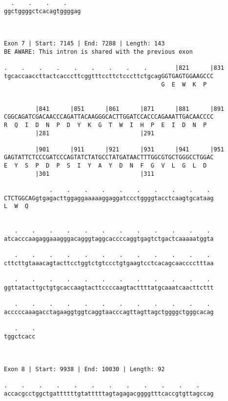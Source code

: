 \documentclass{article}
\begin{document}
\begin{Verbatim}
  .    .    .    .    
ggctggggctcacagtggggag
                      
                      
 
Exon 7 | Start: 7145 | End: 7288 | Length: 143
BE AWARE: This intron is shared with the previous exon
 
.    .    .    .    .    .    .    .    .        |821      |831
tgcaccaaccttactcacccttcggtttccttctcccttctgcagGGTGAGTGGAAGCCC
                                             G  E  W  K  P  
                                                            
  
         |841      |851      |861      |871      |881      |891
CGGCAGATCGACAACCCAGATTACAAGGGCACTTGGATCCACCCAGAAATTGACAACCCC
R  Q  I  D  N  P  D  Y  K  G  T  W  I  H  P  E  I  D  N  P  
         |281                          |291                 
  
         |901      |911      |921      |931      |941      |951
GAGTATTCTCCCGATCCCAGTATCTATGCCTATGATAACTTTGGCGTGCTGGGCCTGGAC
E  Y  S  P  D  P  S  I  Y  A  Y  D  N  F  G  V  L  G  L  D  
         |301                          |311                 
  
             .    .    .    .    .    .    .    .    .    . 
CTCTGGCAGgtgagacttggaggaaaaaggaggatccctggggtacctcaagtgcataag
L  W  Q                                                     
                                                            
  
   .    .    .    .    .    .    .    .    .    .    .    . 
atcacccaagaggaaagggacagggtaggcaccccaggtgagtctgactcaaaaatggta
                                                            
   .    .    .    .    .    .    .    .    .    .    .    . 
cttcttgtaaacagtacttcctggtctgtccctgtgaagtcctcacagcaacccctttaa
                                                            
   .    .    .    .    .    .    .    .    .    .    .    . 
ggttatacttgctgtgcaccaagtacttccccaagtacttttatgcaaatcaacttcttt
                                                            
   .    .    .    .    .    .    .    .    .    .    .    . 
acccccaaagacctagaaggtggtcaggtaacccagttagttagctggggctgggcacag
                                                            
   .    .
tggctcacc
         
         
 
Exon 8 | Start: 9938 | End: 10030 | Length: 92
 
.    .    .    .    .    .    .    .    .    .    .    .    
accacgcctggctgattttttgtatttttagtagagacggggtttcaccgtgttagccag
                                                            

\end{Verbatim}
\end{document}
